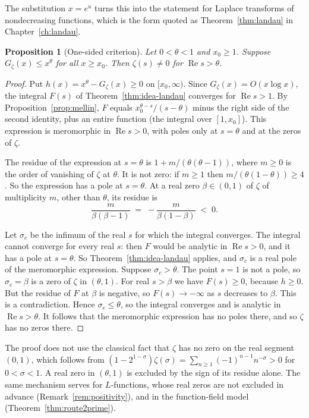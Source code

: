 \documentclass[11pt]{amsbook}
\theoremstyle{plain}
\newtheorem{proposition}[theorem]{Proposition}
\theoremstyle{definition}
\theoremstyle{remark}
\numberwithin{equation}{section}
\numberwithin{figure}{chapter}
\numberwithin{table}{chapter}
\newcommand{\Gz}{G_{\zeta}}
\begin{document}
The substitution $x = e^u$ turns this into the statement for Laplace
transforms of nondecreasing functions, which is the form quoted as
Theorem~\ref{thm:landau} in Chapter~\ref{ch:landau}.

\begin{proposition}[One-sided criterion]\label{prop:idea-landau}
Let $0 < \theta < 1$ and $x_0 \ge 1$. Suppose $\Gz(x) \le x^\theta$
for all $x \ge x_0$. Then $\zeta(s) \ne 0$ for
$\operatorname{Re} s > \theta$.
\end{proposition}

\begin{proof}
Put $h(x) = x^\theta - \Gz(x) \ge 0$ on $[x_0, \infty)$. Since
$\Gz(x) = O(x\log x)$, the integral $F(s)$ of
Theorem~\ref{thm:idea-landau} converges for
$\operatorname{Re} s > 1$. By Proposition~\ref{prop:mellin}, $F$
equals $x_0^{\theta - s}/(s - \theta)$ minus the right side of the
second identity, plus an entire function (the integral over
$[1, x_0]$). This expression is meromorphic in
$\operatorname{Re} s > 0$, with poles only at $s = \theta$ and at
the zeros of $\zeta$.

The residue of the expression at $s = \theta$ is
$1 + m/(\theta(\theta - 1))$, where $m \ge 0$ is the order of
vanishing of $\zeta$ at $\theta$. It is not zero: if $m \ge 1$ then
$m/(\theta(1-\theta)) \ge 4$. So the expression has a pole at
$s = \theta$. At a real zero $\beta \in (0,1)$ of $\zeta$ of
multiplicity $m$, other than $\theta$, its residue is
\[
  \frac{m}{\beta(\beta - 1)} \;=\; -\frac{m}{\beta(1-\beta)} \;<\; 0 .
\]

Let $\sigma_c$ be the infimum of the real $s$ for which the integral
converges. The integral cannot converge for every real $s$: then
$F$ would be analytic in $\operatorname{Re} s > 0$, and it has a
pole at $s = \theta$. So Theorem~\ref{thm:idea-landau} applies, and
$\sigma_c$ is a real pole of the meromorphic expression. Suppose
$\sigma_c > \theta$. The point $s = 1$ is not a pole, so
$\sigma_c = \beta$ is a zero of $\zeta$ in $(\theta, 1)$. For real
$s > \beta$ we have $F(s) \ge 0$, because $h \ge 0$. But the residue
of $F$ at $\beta$ is negative, so $F(s) \to -\infty$ as $s$
decreases to $\beta$. This is a contradiction. Hence
$\sigma_c \le \theta$, so the integral converges and is analytic in
$\operatorname{Re} s > \theta$. It follows that the meromorphic
expression has no poles there, and so $\zeta$ has no zeros there.
\end{proof}

The proof does not use the classical fact that $\zeta$ has no zero
on the real segment $(0,1)$, which follows from
$(1 - 2^{1-\sigma})\zeta(\sigma)
= \sum_{n \ge 1}(-1)^{n-1}n^{-\sigma} > 0$ for $0 < \sigma < 1$. A
real zero in $(\theta, 1)$ is excluded by the sign of its residue
alone. The same mechanism serves for
$L$-functions, whose real zeros are not excluded in advance
(Remark~\ref{rem:positivity}), and in the function-field model
(Theorem~\ref{thm:route2prime}).
\end{document}
